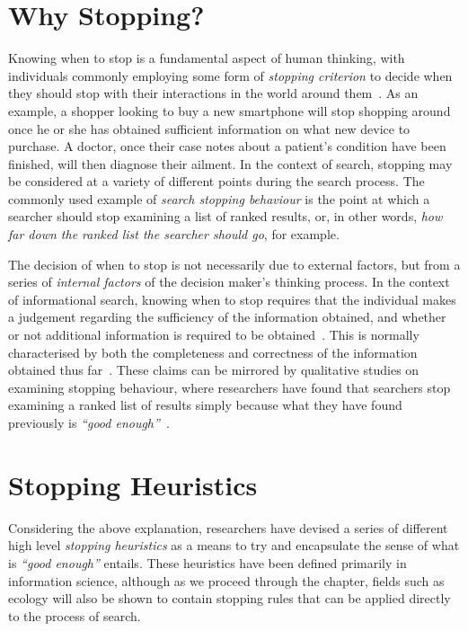 \section{Why Stopping?}
 Knowing when to stop is a fundamental aspect of human thinking, with individuals commonly employing some form of \emph{stopping criterion} to decide when they should stop with their interactions in the world around them~\citep{nickles1995judgment}. As an example, a shopper looking to buy a new smartphone will stop shopping around once he or she has obtained sufficient information on what new device to purchase. A doctor, once their case notes about a patient's condition have been finished, will then diagnose their ailment. In the context of search, stopping may be considered at a variety of different points during the search process. The commonly used example of \emph{search stopping behaviour} is the point at which a searcher should stop examining a list of ranked results, or, in other words, \emph{how far down the ranked list the searcher should go}, for example.

The decision of when to stop is not necessarily due to external factors, but from a series of \emph{internal factors} of the decision maker's thinking process. In the context of informational search, knowing when to stop requires that the individual makes a judgement regarding the sufficiency of the information obtained, and whether or not additional information is required to be obtained~\citep{browne2004stopping_rules}. This is normally characterised by both the completeness and correctness of the information obtained thus far~\citep{smith1991belief}. These claims can be mirrored by qualitative studies on examining stopping behaviour, where researchers have found that searchers stop examining a ranked list of results simply because what they have found previously is \emph{``good enough''}~\citep{wu2014information_scent}.

\section{Stopping Heuristics}\label{sec:stopping_background:heuristics}
Considering the above explanation, researchers have devised a series of different high level \emph{stopping heuristics} as a means to try and encapsulate the sense of what is \emph{``good enough''} entails. These heuristics have been defined primarily in information science, although as we proceed through the chapter, fields such as ecology will also be shown to contain stopping rules that can be applied directly to the process of search.

